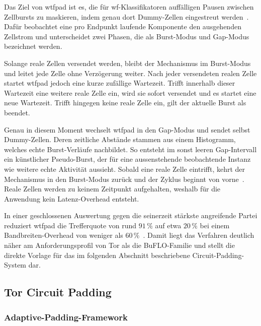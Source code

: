 Das Ziel von \gls{wtfpad} ist es, die für \gls{wf}-Klassifikatoren auffälligen Pausen zwischen  Zellbursts zu maskieren, indem genau dort Dummy-Zellen eingestreut werden~\cite{juarez2015wtf}.
Dafür beobachtet eine pro Endpunkt laufende Komponente den ausgehenden Zellstrom und unterscheidet zwei Phasen, die als Burst-Modus und Gap-Modus bezeichnet werden.

Solange reale Zellen versendet werden, bleibt der Mechanismus im Burst-Modus und leitet jede Zelle ohne Verzögerung weiter.
Nach jeder versendeten realen Zelle startet \gls{wtfpad} jedoch eine kurze zufällige Wartezeit.
Trifft innerhalb dieser Wartezeit eine weitere reale Zelle ein, wird sie sofort versendet und es startet eine neue Wartezeit.
Trifft hingegen keine reale Zelle ein, gilt der aktuelle Burst als beendet.

Genau in diesem Moment wechselt \gls{wtfpad} in den Gap-Modus und sendet selbst Dummy-Zellen.
Deren zeitliche Abstände stammen aus einem Histogramm, welches echte Burst-Verläufe nachbildet.
So entsteht im sonst leeren Gap-Intervall ein künstlicher Pseudo-Burst, der für eine aussenstehende beobachtende Instanz wie weitere echte Aktivität aussieht.
Sobald eine reale Zelle eintrifft, kehrt der Mechanismus in den Burst-Modus zurück und der Zyklus beginnt von vorne~\cite{juarez2015wtf}.
Reale Zellen werden zu keinem Zeitpunkt aufgehalten, weshalb für die Anwendung kein Latenz-Overhead entsteht.

In einer geschlossenen Auswertung gegen die seinerzeit stärkste angreifende Partei reduziert \gls{wtfpad} die Trefferquote von rund $91\,\%$ auf etwa $20\,\%$ bei einem Bandbreiten-Overhead von weniger als $60\,\%$~\cite{juarez2015wtf}.
Damit liegt das Verfahren deutlich näher am Anforderungsprofil von Tor als die BuFLO-Familie und stellt die direkte Vorlage für das im folgenden Abschnitt beschriebene Circuit-Padding-System dar.

\subsection{Tor Circuit Padding}
\label{sec:wf_defenses_torpadding}

\subsubsection{Adaptive-Padding-Framework}

